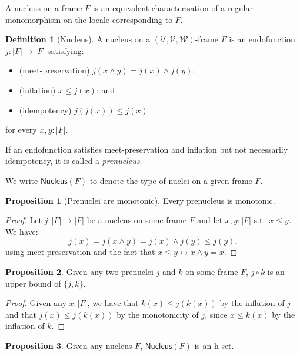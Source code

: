 \documentclass[a4paper, 11pt]{article}
\theoremstyle{definition}
\newtheorem{prop}{Proposition}
\newtheorem{defn}{Definition}
\newcommand{\UU}{\mathcal{U}}
\newcommand{\VV}{\mathcal{V}}
\newcommand{\WW}{\mathcal{W}}
\begin{document}
A nucleus on a frame $F$ is an equivalent characterisation of a regular monomorphism on the locale
corresponding to $F$.

\begin{defn}[Nucleus]
  A nucleus on a $(\UU, \VV, \WW)$-frame $F$ is an endofunction
  $j : | F | \rightarrow | F |$ satisfying:
  \begin{itemize}
    \item (meet-preservation) $j(x \wedge y) = j(x) \wedge j(y)$;
    \item (inflation) $x \le j(x)$; and
    \item (idempotency) $j(j(x)) \le j(x)$.
  \end{itemize}
  for every $x, y : | F |$.
\end{defn}

If an endofunction satisfies meet-preservation and inflation but not necessarily idempotency, it is
called a \emph{prenucleus}.

We write $\mathsf{Nucleus}(F)$ to denote the type of nuclei on a given frame $F$.

\begin{prop}[Prenuclei are monotonic]\label{prop:nuclei-mono}
  Every prenucleus is monotonic.
\end{prop}
\begin{proof}
  Let $j : | F | \rightarrow | F |$ be a nucleus on some frame $F$ and let $x, y : | F |$
  s.t.\ $x \le y$.
  We have:
  \begin{equation*}
    j(x) = j (x \wedge y) = j(x) \wedge j(y) \le j(y),
  \end{equation*}
  using meet-preservation and the fact that $x \le y \leftrightarrow x \wedge y = x$.
\end{proof}

\begin{prop}\label{prop:nucl-lemma-1}
  Given any two prenuclei $j$ and $k$ on some frame $F$, $j \circ k$ is an upper bound of $\{ j, k \}$.
\end{prop}
\begin{proof}
  Given any $x : | F |$, we have that $k(x) \le j(k(x))$ by the inflation of $j$ and that
  $j(x) \le j(k(x))$ by the monotonicity of $j$, since $x \le k(x)$ by the inflation of $k$.
\end{proof}

\begin{prop}
  Given any nucleus $F$, $\mathsf{Nucleus}(F)$ is an h-set.
\end{prop}
\end{document}
